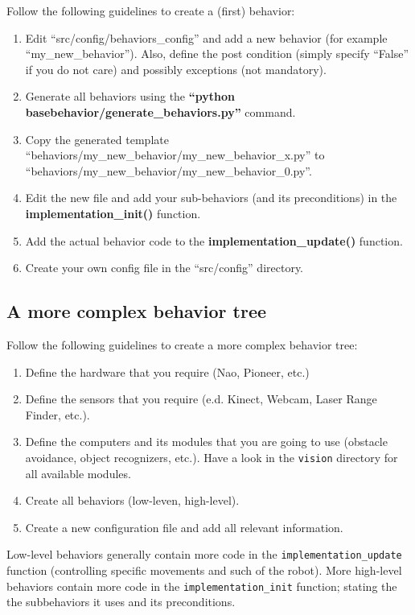 \documentclass[a4paper, 10pt]{article}
\begin{document}
Follow the following guidelines to create a (first) behavior:

\begin{enumerate}
    \item Edit ``src/config/behaviors\_config'' and add a new behavior (for example ``my\_new\_behavior''). 
        Also, define the post condition (simply specify ``False'' if you do not care) and possibly exceptions (not mandatory).
    \item Generate all behaviors using the \textbf{``python basebehavior/generate\_behaviors.py''} command.
    \item Copy the generated template ``behaviors/my\_new\_behavior/my\_new\_behavior\_x.py'' to 
        \\ ``behaviors/my\_new\_behavior/my\_new\_behavior\_0.py''.
    \item Edit the new file and add your sub-behaviors (and its preconditions) in the \textbf{implementation\_init()} function.
    \item Add the actual behavior code to the \textbf{implementation\_update()} function.
    \item Create your own config file in the ``src/config'' directory.
\end{enumerate}

\subsection{A more complex behavior tree}

Follow the following guidelines to create a more complex behavior tree:

\begin{enumerate}
    \item Define the hardware that you require (Nao, Pioneer, etc.)
    \item Define the sensors that you require (e.d. Kinect, Webcam, Laser Range Finder, etc.).
    \item Define the computers and its modules that you are going to use (obstacle avoidance, object recognizers, etc.). 
        Have a look in the \lstinline{vision} directory for all available modules.
    \item Create all behaviors (low-leven, high-level). 
    \item Create a new configuration file and add all relevant information.
\end{enumerate}

Low-level behaviors generally contain more code in the \lstinline{implementation_update} function (controlling specific movements and such of the robot).
More high-level behaviors contain more code in the \lstinline{implementation_init} function; stating the the subbehaviors it uses and its preconditions.
\end{document}
